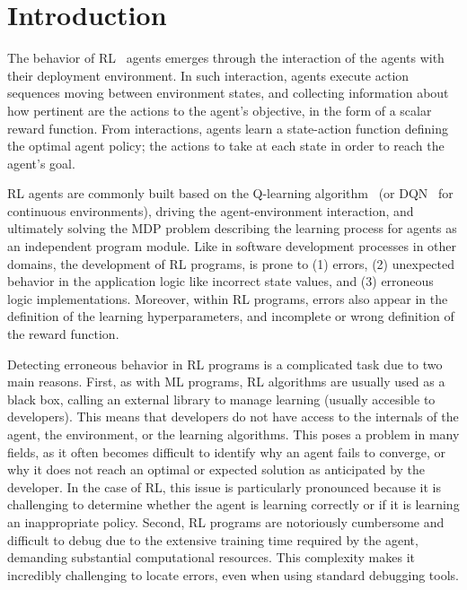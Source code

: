 
\section{Introduction}
\label{sec:intro}

The behavior of \ac{RL}~\cite{sutton18} agents emerges through the interaction of the agents with 
their deployment environment. In such interaction, agents execute action sequences moving 
between environment states, and collecting information about how pertinent are the actions to the 
agent's objective, in the form of a scalar reward function. From interactions, agents learn a 
state-action function defining the optimal agent policy; the actions to take at each state in order to 
reach the agent's goal.

\ac{RL} agents are commonly built based on the Q-learning algorithm~\cite{beakcheol19} (or 
\ac{DQN}~\cite{fan20} for continuous environments), driving the agent-environment interaction, 
and ultimately solving the \ac{MDP} problem describing the learning process for agents as an 
independent program module. Like in software development processes in other domains, the 
development of \ac{RL} programs, is prone to (1) errors, (2) unexpected behavior in the application 
logic like incorrect state values, and (3) erroneous logic implementations. Moreover, within \ac{RL} 
programs, errors also appear in the definition of the learning hyperparameters, and incomplete or 
wrong definition of the reward function. 

Detecting erroneous behavior in \ac{RL} programs is a complicated task due to two main reasons. 
First, as with \ac{ML} programs, \ac{RL} algorithms are usually used as a black box, calling an external 
library to manage learning (usually accesible to developers). This means that 
developers do not have access to the internals of the agent, the environment, or the learning 
algorithms. This poses a problem in many fields, as it often becomes difficult to identify why an agent 
fails to converge, or why it does not reach an optimal or expected solution as anticipated by the 
developer. In the case of \ac{RL}, this issue is particularly pronounced because it is challenging to 
determine whether the agent is learning correctly or if it is learning an inappropriate policy.
Second, \ac{RL} programs are notoriously cumbersome and difficult to debug due to the extensive 
training time required by the agent, demanding substantial computational resources. This 
complexity makes it incredibly challenging to locate errors, even when using standard 
debugging tools. 

